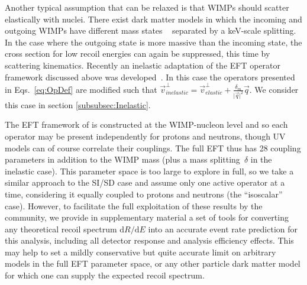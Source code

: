 	    Another typical assumption that can be relaxed is that WIMPs should scatter elastically with nuclei. There exist dark matter models in which the incoming and outgoing WIMPs have different mass states ~\cite{InelasticIntro} separated by a keV-scale splitting. In the case where the outgoing state is more massive than the incoming state, the cross section for low recoil energies can again be suppressed, this time by scattering kinematics. Recently an inelastic adaptation of the EFT operator framework discussed above was developed~\cite{InelasticMath}. In this case the operators presented in Eqs.~\ref{eq:OpDef} are modified such that $\vec{v}^\perp_{inelastic} = \vec{v}^\perp_{elastic} +\frac{\delta_m}{\vert{\vec{q}}\vert^2}\vec{q}$. We consider this case in section \ref{subsubsec:Inelastic}.
	    
The EFT framework of \cite{Fitzpatrick:2012ib} is constructed at the WIMP-nucleon level and so each operator may be present independently for protons and neutrons, though UV models can of course correlate their couplings. The full EFT thus has 28 coupling parameters in addition to the WIMP mass (plus a mass splitting~$\delta$ in the inelastic case). This parameter space is too large to explore in full, so we take a similar approach to the SI/SD case 
and assume only one active operator at a time, considering it equally coupled to protons and neutrons (the ``isoscalar'' case). However, to facilitate the full exploitation of these results by the community, we provide in supplementary material a set of tools for converting any theoretical recoil spectrum $\mathrm{d}R/\mathrm{d}E$ into an accurate event rate prediction for this analysis, including all detector response and analysis efficiency effects. This may help to set a mildly conservative but quite accurate limit on arbitrary models in the full EFT parameter space, or any other particle dark matter model for which one can supply the expected recoil spectrum.

